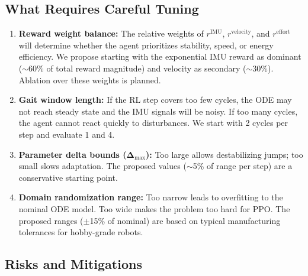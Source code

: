 \documentclass[11pt]{article}
\begin{document}
\subsection{What Requires Careful Tuning}

\begin{enumerate}
    \item \textbf{Reward weight balance:} The relative weights of $r^{\mathrm{IMU}}$, $r^{\mathrm{velocity}}$, and $r^{\mathrm{effort}}$ will determine whether the agent prioritizes stability, speed, or energy efficiency. We propose starting with the exponential IMU reward as dominant ($\sim$60\% of total reward magnitude) and velocity as secondary ($\sim$30\%). Ablation over these weights is planned.
    
    \item \textbf{Gait window length:} If the RL step covers too few cycles, the ODE may not reach steady state and the IMU signals will be noisy. If too many cycles, the agent cannot react quickly to disturbances. We start with 2 cycles per step and evaluate 1 and 4.
    
    \item \textbf{Parameter delta bounds ($\boldsymbol{\Delta}_{\max}$):} Too large allows destabilizing jumps; too small slows adaptation. The proposed values ($\sim$5\% of range per step) are a conservative starting point.
    
    \item \textbf{Domain randomization range:} Too narrow leads to overfitting to the nominal ODE model. Too wide makes the problem too hard for PPO. The proposed ranges ($\pm$15\% of nominal) are based on typical manufacturing tolerances for hobby-grade robots.
\end{enumerate}

\subsection{Risks and Mitigations}
\end{document}
